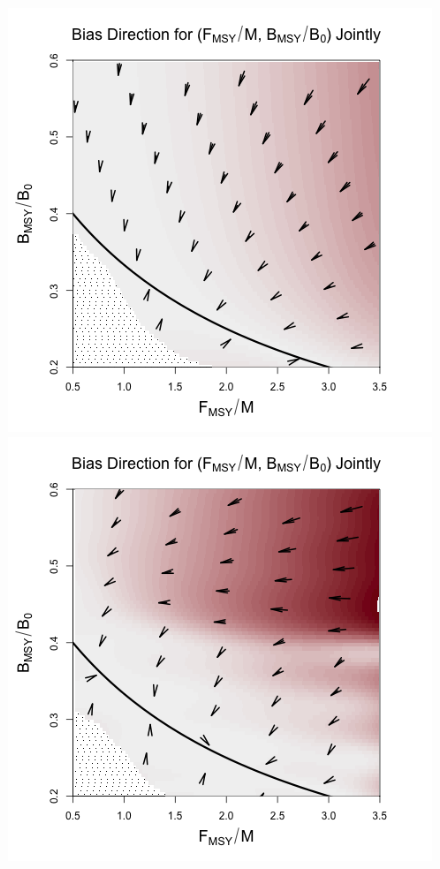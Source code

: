 %
\begin{figure}[h!]
\begin{minipage}[h!]{0.44\textwidth}
\includegraphics[width=\textwidth]{../ddBias/directionalBiasDDSubExpT45N300AS0.1K10.png}
\end{minipage}
\begin{minipage}[h!]{0.44\textwidth}
\includegraphics[width=\textwidth]{../ddBias/directionalBiasDDSubFlatT45N150A0-1AS0.1K10N56.png}

\end{minipage}
\end{figure}
